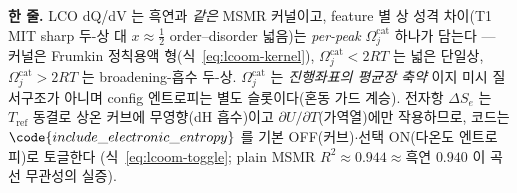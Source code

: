 \begin{keybox}
\textbf{한 줄.} LCO dQ/dV 는 흑연과 \emph{같은} MSMR 커널이고, feature 별 상 성격 차이(T1 MIT sharp 두-상 대
$x\!\approx\!\tfrac12$ order--disorder 넓음)는 \emph{per-peak} $\Omega_j^\mathrm{cat}$ 하나가 담는다 --- 커널은
Frumkin 정칙용액 형(식~\eqref{eq:lcoom-kernel}), $\Omega_j^\mathrm{cat}<2RT$ 는 넓은 단일상,
$\Omega_j^\mathrm{cat}>2RT$ 는 broadening-흡수 두-상. $\Omega_j^\mathrm{cat}$ 는 \emph{진행좌표의 평균장 축약}
이지 미시 질서구조가 아니며 config 엔트로피는 별도 슬롯이다(혼동 가드 계승). 전자항 $\Delta S_e$ 는
$T_\mathrm{ref}$ 동결로 상온 커브에 무영향(dH 흡수)이고 $\partial U/\partial T$(가역열)에만 작용하므로, 코드는
$\code{include\_electronic\_entropy}$ 를 기본 OFF(커브)$\cdot$선택 ON(다온도 엔트로피)로 토글한다
(식~\eqref{eq:lcoom-toggle}; plain MSMR $R^2\!\approx\!0.944\!\approx\!$흑연 $0.940$ 이 곡선 무관성의 실증).
\end{keybox}
